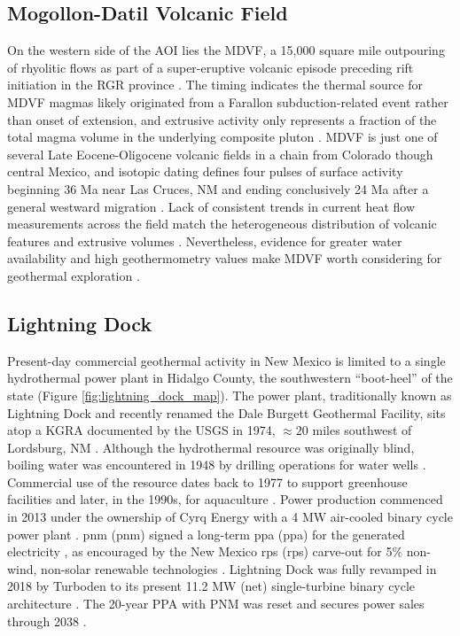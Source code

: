 \subsection{Mogollon-Datil Volcanic Field}\label{ch2:mdvf_province}
On the western side of the AOI lies the MDVF, a 15,000 square mile outpouring of rhyolitic flows as part of a super-eruptive volcanic episode preceding rift initiation in the RGR province \citep{keller_rio_1999}. The timing indicates the thermal source for MDVF magmas likely originated from a Farallon subduction-related event rather than onset of extension, and extrusive activity only represents a fraction of the total magma volume in the underlying composite pluton \citep{olsen_rio_1987,schneider_crustal_1994}. MDVF is just one of several Late Eocene-Oligocene volcanic fields in a chain from Colorado though central Mexico, and isotopic dating defines four pulses of surface activity beginning 36 Ma near Las Cruces, NM and ending conclusively 24 Ma after a general westward migration \citep{mcintosh_time-stratigraphic_1992}. Lack of consistent trends in current heat flow measurements across the field match the heterogeneous distribution of volcanic features and extrusive volumes \citep{mcintosh_time-stratigraphic_1992}. Nevertheless, evidence for greater water availability and high geothermometry values make MDVF worth considering for geothermal exploration \citep{pepin_new_2019}.

\subsection{Lightning Dock}\label{ch2:lightning_dock}
Present-day commercial geothermal activity in New Mexico is limited to a single hydrothermal power plant in Hidalgo County, the southwestern ``boot-heel'' of the state (Figure \ref{fig:lightning_dock_map}). The power plant, traditionally known as Lightning Dock and recently renamed the Dale Burgett Geothermal Facility, sits atop a KGRA documented by the USGS in 1974, $\approx20$ miles southwest of Lordsburg, NM \citep{dahal_evaluation_2012}. Although the hydrothermal resource was originally blind, boiling water was encountered in 1948 by drilling operations for water wells \citep{elston_geology_1983}. Commercial use of the resource dates back to 1977 to support greenhouse facilities and later, in the 1990s, for aquaculture \citep{crowell_history_2014}. Power production commenced in 2013 under the ownership of Cyrq Energy with a 4 MW air-cooled binary cycle power plant \citep{goodman_lightning_2013}. \acrlong{pnm} (\acrshort{pnm}) signed a long-term \acrlong{ppa} (\acrshort{ppa}) for the generated electricity \citep{dahal_evaluation_2012}, as encouraged by the New Mexico \acrlong{rps} (\acrshort{rps}) carve-out for 5\% non-wind, non-solar renewable technologies \citep{dsire_dsire_2021}. Lightning Dock was fully revamped in 2018 by Turboden to its present 11.2 MW (net) single-turbine binary cycle architecture \citep{bonafin_repowering_2019}. The 20-year PPA with PNM was reset and secures power sales through 2038 \citep{oconnell_matter_2018}.

